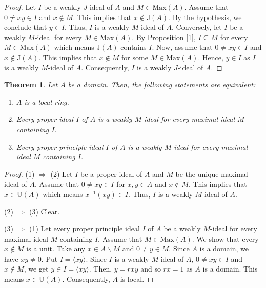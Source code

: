 \documentclass[preprint,review,10pt]{amsart}
\newtheorem{theorem}{Theorem}[section]
\theoremstyle{definition}
\theoremstyle{remark}
\numberwithin{equation}{section}
\begin{document}
\begin{proof}
Let $I$ be a weakly $J$-ideal of $A$ and $M \in \text{Max}(A)$. Assume that $0 \neq xy \in I$ and $x \notin M$. This implies that $x \notin \text{J}(A)$. By the hypothesis, we conclude that $y \in I$. Thus, $I$ is a weakly $M$-ideal of $A$. Conversely, let $I$ be a weakly $M$-ideal for every  $M \in \text{Max}(A)$. By Proposition \ref{1}, $I \subseteq M$ for every $M \in \text{Max}(A)$ which means $\text{J}(A)$ contains $I$. Now, assume that $0 \neq xy \in I$ and $x \notin \text{J}(A)$. This implies that $x \notin M$ for some $M \in \text{Max}(A)$. Hence, $y \in I$ as $I$ is a weakly $M$-ideal of $A$. Consequently, $I$ is a weakly $J$-ideal of $A$.
\end{proof}
\begin{theorem}\label{3}
Let $A$ be a domain.  Then, the following statements are equivalent:
\begin{enumerate}
\item $A$ is a  local ring.
\item  Every  proper ideal $I$ of $A$  is a weakly  $M$-ideal for every maximal ideal $M$ containing $I$.
\item  Every proper principle ideal $I$ of $A$  is a weakly  $M$-ideal for every maximal ideal $M$ containing $I$.
\end{enumerate}    
\end{theorem}
\begin{proof}
(1) $\Longrightarrow$ (2)   Let   $I$ be a proper ideal of $A$ and $M$ be the unique maximal ideal of $A$. Assume that  $0 \neq xy \in I$ for $x,y \in A$ and $x \notin M$. This implies that $x \in \text{U}(A)$ which means $x^{-1}(xy) \in I$. Thus, $I$ is a weakly  $M$-ideal of $A$.

(2) $\Longrightarrow$ (3) Clear.

(3) $\Longrightarrow$ (1) Let every proper principle ideal $I$ of $A$  be a weakly  $M$-ideal for every maximal ideal $M$ containing $I$. Assume that $M \in \text{Max}(A)$. We show that every $x \notin M$ is a unit. Take any $x \in A \backslash M$ and $0 \neq y \in M$. Since $A$ is a domain, we have $xy \neq 0$. Put $I=\langle xy \rangle$. Since $I$ is a weakly $M$-ideal of $A$, $0 \neq xy \in I$ and $x \notin M$, we get $y \in I=\langle xy \rangle$. Then, $y=rxy$ and so $rx=1$ as $A$ is a domain. This means $x \in \text{U}(A)$. Consequently, $A$ is local.
\end{proof}
\end{document}
